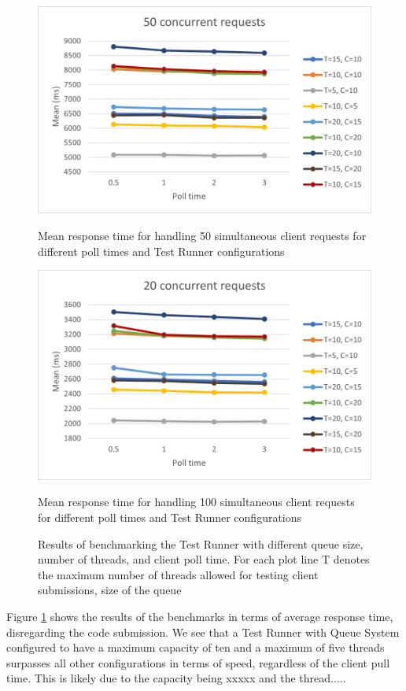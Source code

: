 \begin{figure}[!tbp]
\begin{minipage}[t]{0.4\textwidth}
    \includegraphics[scale=0.65]{images/50.png}
    \caption{Mean response time for handling 50 simultaneous client requests for different poll times and Test Runner configurations}
  \end{minipage}
  \hfill
  \begin{minipage}[t]{0.4\textwidth}
    \centering
    \includegraphics[scale=0.65]{images/20.png}
    \caption{Mean response time for handling 100 simultaneous client requests for different poll times and Test Runner configurations}
  \end{minipage}
  \label{fig:results}
  \caption{Results of benchmarking the Test Runner with different queue size, number of threads, and client poll time. For each plot line T denotes the maximum number of threads allowed for testing client submissions, size of the queue}
\end{figure}

Figure \ref{fig:results} shows the results of the benchmarks in terms of average response time, disregarding the code submission. 
We see that a Test Runner with Queue System configured to have a maximum capacity of ten and a maximum of five threads surpasses all other configurations in terms of speed, regardless of the client pull time. 
This is likely due to the capacity being xxxxx and the thread..... 


